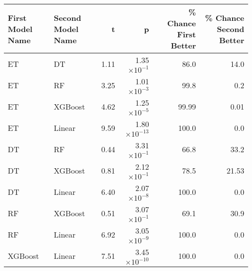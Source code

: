 \begin{tabular}{llrrrr}
\toprule
First Model Name & Second Model Name &    t &            p &  \% Chance First Better &  \% Chance Second Better \\
\midrule
              ET &                DT & 1.11 & 1.35$\times10^{-1}$ &                  86.0 &                   14.0 \\
              ET &                RF & 3.25 & 1.01$\times10^{-3}$ &                  99.8 &                    0.2 \\
              ET &           XGBoost & 4.62 & 1.25$\times10^{-5}$ &                  99.99 &                    0.01 \\
              ET &            Linear & 9.59 & 1.80$\times10^{-13}$ &                 100.0 &                    0.0 \\
              DT &                RF & 0.44 & 3.31$\times10^{-1}$ &                  66.8 &                   33.2 \\
              DT &           XGBoost & 0.81 & 2.12$\times10^{-1}$ &                  78.5 &                   21.53 \\
              DT &            Linear & 6.40 & 2.07$\times10^{-8}$ &                 100.0 &                    0.0 \\
              RF &           XGBoost & 0.51 & 3.07$\times10^{-1}$ &                  69.1 &                   30.9 \\
              RF &            Linear & 6.92 & 3.05$\times10^{-9}$ &                 100.0 &                    0.0 \\
         XGBoost &            Linear & 7.51 & 3.45$\times10^{-10}$ &                 100.0 &                    0.0 \\
\bottomrule
\end{tabular}
